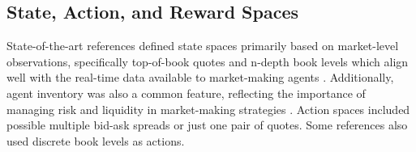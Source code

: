 \subsection{State, Action, and Reward Spaces}

State-of-the-art references defined state spaces primarily based on market-level observations,
specifically top-of-book quotes and n-depth book levels which align well with the real-time data available to market-making agents \cite{he2023integrating, bakshaev2020marketmaking}.
Additionally, agent inventory was also a common feature, reflecting the importance of managing risk and liquidity in market-making strategies \cite{patel2018optimizing, ganesh2019reinforcement}.
Action spaces included possible multiple bid-ask spreads or just one pair of quotes. Some references also used discrete book levels as actions.

